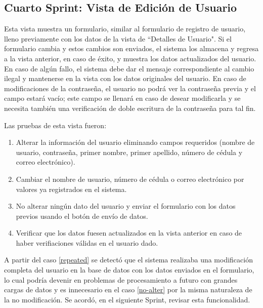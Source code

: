     \subsection{Cuarto Sprint: Vista de Edición de Usuario}
    
    Esta vista muestra un formulario, similar al formulario de registro de usuario, lleno previamente con los datos de la vista de ``Detalles de Usuario". Si el formulario cambia y estos cambios son enviados, el sistema los almacena y regresa a la vista anterior, en caso de éxito, y muestra los datos actualizados del usuario. En caso de algún fallo, el sistema debe dar el mensaje correspondiente al cambio ilegal y mantenerse en la vista con los datos originales del usuario. En caso de modificaciones de la contraseña, el usuario no podrá ver la contraseña previa y el campo estará vacío; este campo se llenará en caso de desear modificarla y se necesita también una verificación de doble escritura de la contraseña para tal fin.
    
    Las pruebas de esta vista fueron:
    \begin{enumerate}
        \item\label{required} Alterar la información del usuario eliminando campos requeridos (nombre de usuario, contraseña, primer nombre, primer apellido, número de cédula y correo electrónico).
        \item\label{repeated} Cambiar el nombre de usuario, número de cédula o correo electrónico por valores ya registrados en el sistema.
        \item\label{no-alter} No alterar ningún dato del usuario y enviar el formulario con los datos previos usando el botón de envío de datos.
        \item\label{details} Verificar que los datos fuesen actualizados en la vista anterior en caso de haber verifiaciones válidas en el usuario dado.
    \end{enumerate}
    
    A partir del caso \ref{repeated} se detectó que el sistema realizaba una modificación completa del usuario en la base de datos con los datos enviados en el formulario, lo cual podría devenir en problemas de procesamiento a futuro con grandes cargas de datos y es innecesario en el caso \ref{no-alter} por la misma naturaleza de la no modificación. Se acordó, en el siguiente Sprint, revisar esta funcionalidad.
    
